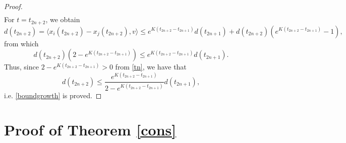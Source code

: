 \documentclass[a4paper,11pt,oneside]{article}
\begin{document}
\begin{proof}
$$\begin{array}{l}
\end{array}$$
For $t=t_{2n+2}$, we obtain $$
	d(t_{2n+2})=\langle x_{i}(t_{2n+2})-x_{j}(t_{2n+2}),v\rangle\leq 
	e^{K(t_{2n+2}-t_{2n+1})}d(t_{2n+1})+d(t_{2n+2})(e^{K(t_{2n+2}-t_{2n+1})}-1),
$$
from which
$$d(t_{2n+2})(2-e^{K(t_{2n+2}-t_{2n+1})})\leq e^{K(t_{2n+2}-t_{2n+1})}d(t_{2n+1}).$$
Thus, since $2-e^{K(t_{2n+2}-t_{2n+1})}>0$ from \eqref{tn}, we have that
$$d(t_{2n+2})\leq \frac{e^{K(t_{2n+2}-t_{2n+1})}}{2-e^{K(t_{2n+2}-t_{2n+1})}}d(t_{2n+1}),$$i.e. \eqref{boundgrowth} is proved.
\end{proof}
\section{Proof of Theorem \ref{cons}}\label{consensus_sec}
	
	\setcounter{equation}{0}
	
\end{document}
